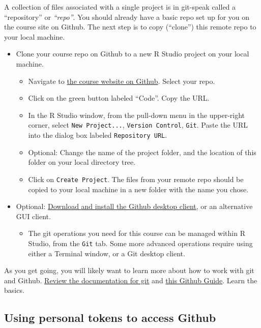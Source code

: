 \documentclass[
]{book}
\providecommand{\tightlist}{%
  \setlength{\itemsep}{0pt}\setlength{\parskip}{0pt}}
\begin{document}
A collection of files associated with a single project is in git-speak called a ``repository'' or \emph{``repo''}. You should already have a basic repo set up for you on the course site on Github. The next step is to copy (``clone'') this remote repo to your local machine.

\begin{itemize}
\tightlist
\item
  Clone your course repo on Github to a new R Studio project on your local machine.

  \begin{itemize}
  \tightlist
  \item
    Navigate to \href{https://github.com/uva-eng-time-series-sp21}{the course website on Github}. Select your repo.
  \item
    Click on the green button labeled ``Code''. Copy the URL.
  \item
    In the R Studio window, from the pull-down menu in the upper-right corner, select \texttt{New\ Project...}, \texttt{Version\ Control}, \texttt{Git}. Paste the URL into the dialog box labeled \texttt{Repository\ URL}.
  \item
    Optional: Change the name of the project folder, and the location of this folder on your local directory tree.
  \item
    Click on \texttt{Create\ Project}. The files from your remote repo should be copied to your local machine in a new folder with the name you chose.
  \end{itemize}
\item
  Optional: \href{https://git-scm.com/downloads/guis}{Download and install the Github desktop client}, or an alternative GUI client.

  \begin{itemize}
  \tightlist
  \item
    The git operations you need for this course can be managed within R Studio, from the \texttt{Git} tab. Some more advanced operations require using either a Terminal window, or a Git desktop client.
  \end{itemize}
\end{itemize}

As you get going, you will likely want to learn more about how to work with git and Github. \href{https://git-scm.com/}{Review the documentation for git} and \href{https://guides.github.com/introduction/flow/}{this Github Guide}. Learn the basics.

\hypertarget{using-personal-tokens-to-access-github}{%
\subsection{Using personal tokens to access Github}\label{using-personal-tokens-to-access-github}}
\end{document}
